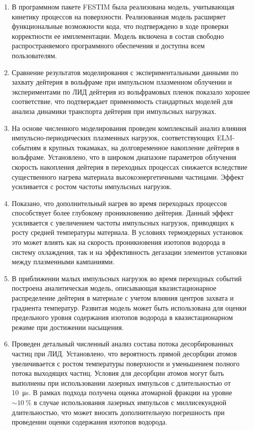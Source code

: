\begin{enumerate}
  \item В программном пакете FESTIM была реализована модель, учитывающая кинетику процессов на поверхности. Реализованная модель расширяет функциональные возможности кода, что подтверждено в ходе проверки корректности ее имплементации. Модель включена в состав свободно распространяемого программного обеспечения и доступна всем пользователям.
  \item Сравнение результатов моделирования с экспериментальными данными по захвату дейтерия в вольфраме при импульсном плазменном облучении и экспериментами по ЛИД дейтерия из вольфрамовых пленок показало хорошее соответствие, что подтверждает применимость стандартных моделей для анализа динамики транспорта дейтерия при импульсных нагрузках.
  \item На основе численного моделирования проведен комплексный анализ влияния импульсно-периодических плазменных нагрузок, соответствующих ELM-событиям в крупных токамаках, на долговременное накопление дейтерия в вольфраме. Установлено, что в широком диапазоне параметров облучения скорость накопления дейтерия в переходных процессах снижается вследствие существенного нагрева материала высокоэнергетичными частицами. Эффект усиливается с ростом частоты импульсных нагрузок. 
  \item Показано, что дополнительный нагрев во время переходных процессов способствует более глубокому проникновению дейтерия. Данный эффект усиливается с увеличением частоты импульсных нагрузок, приводящих к росту средней температуры материала. В условиях термоядерных установок это может влиять как на скорость проникновения изотопов водорода в систему охлаждения, так и на эффективность дегазации элементов установки между плазменными кампаниями.
  \item В приближении малых импульсных нагрузок во время переходных событий построена аналитическая модель, описывающая квазистационарное распределение дейтерия в материале с учетом влияния центров захвата и градиента температур. Развитая модель может быть использована для оценки предельного уровня содержания изотопов водорода в квазистационарном режиме при достижении насыщения.
  \item Проведен детальный численный анализ состава потока десорбированных частиц при ЛИД. Установлено, что вероятность прямой десорбции атомов увеличивается с ростом температуры поверхности и уменьшением полного потока выходящих частиц. Условия для десорбции атомов могут быть выполнены при использовании лазерных импульсов с длительностью от \SI{10}{\micro\second}. В рамках подхода получена оценка атомарной фракции на уровне \( \sim \SI{10}{\percent} \) в случае использования лазерных импульсов с миллисекундной длительностью, что может вносить дополнительную погрешность при проведении оценки содержания изотопов водорода.

\end{enumerate}

